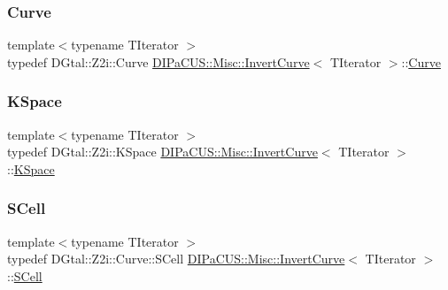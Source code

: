 \subsubsection{\texorpdfstring{Curve}{Curve}}
{\footnotesize\ttfamily template$<$typename T\+Iterator $>$ \\
typedef D\+Gtal\+::\+Z2i\+::\+Curve \hyperlink{structDIPaCUS_1_1Misc_1_1InvertCurve}{D\+I\+Pa\+C\+U\+S\+::\+Misc\+::\+Invert\+Curve}$<$ T\+Iterator $>$\+::\hyperlink{structDIPaCUS_1_1Misc_1_1InvertCurve_a4a338524a4f9be41169d6eeb519c6a20}{Curve}}

\mbox{\label{structDIPaCUS_1_1Misc_1_1InvertCurve_a64773d7b4da91e66b4cc83112d4aa1d1}} 
\subsubsection{\texorpdfstring{K\+Space}{KSpace}}
{\footnotesize\ttfamily template$<$typename T\+Iterator $>$ \\
typedef D\+Gtal\+::\+Z2i\+::\+K\+Space \hyperlink{structDIPaCUS_1_1Misc_1_1InvertCurve}{D\+I\+Pa\+C\+U\+S\+::\+Misc\+::\+Invert\+Curve}$<$ T\+Iterator $>$\+::\hyperlink{structDIPaCUS_1_1Misc_1_1InvertCurve_a64773d7b4da91e66b4cc83112d4aa1d1}{K\+Space}}

\mbox{\label{structDIPaCUS_1_1Misc_1_1InvertCurve_a57f4545d1903fd3953018413c6fd61aa}} 
\subsubsection{\texorpdfstring{S\+Cell}{SCell}}
{\footnotesize\ttfamily template$<$typename T\+Iterator $>$ \\
typedef D\+Gtal\+::\+Z2i\+::\+Curve\+::\+S\+Cell \hyperlink{structDIPaCUS_1_1Misc_1_1InvertCurve}{D\+I\+Pa\+C\+U\+S\+::\+Misc\+::\+Invert\+Curve}$<$ T\+Iterator $>$\+::\hyperlink{structDIPaCUS_1_1Misc_1_1InvertCurve_a57f4545d1903fd3953018413c6fd61aa}{S\+Cell}}



